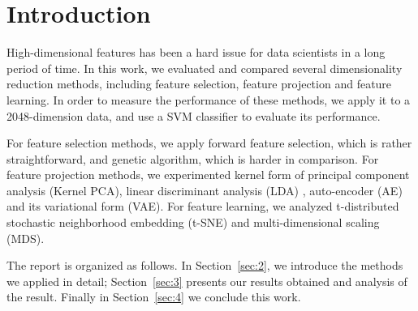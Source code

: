 \documentclass[journal]{IEEEtran}
\begin{document}




\maketitle



%
\IEEEpeerreviewmaketitle



\section{Introduction}
High-dimensional features has been a hard issue for data scientists in a long period of time. In this work, we evaluated and compared several dimensionality reduction methods, including feature selection, feature projection and feature learning. In order to measure the performance of these methods, we apply it to a 2048-dimension data, and use a SVM classifier to evaluate its performance.

For feature selection methods, we apply forward feature selection, which is rather straightforward, and genetic algorithm, which is harder in comparison. For feature projection methods, we experimented kernel form of principal component analysis (Kernel PCA), linear discriminant analysis (LDA) , auto-encoder (AE) and its variational form (VAE). For feature learning, we analyzed t-distributed stochastic neighborhood embedding (t-SNE) and multi-dimensional scaling (MDS).

The report is organized as follows. In Section~\ref{sec:2}, we introduce the methods we applied in detail; Section~\ref{sec:3} presents our results obtained and analysis of the result. Finally in Section~\ref{sec:4} we conclude this work.
\end{document}
